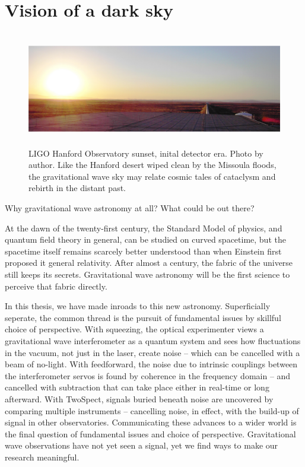     \section{Vision of a dark sky}
    \label{dark_sky}

\begin{figure}
\begin{center}
\includegraphics[height=50mm,width=148mm]{LIGOpanoramasmall.eps}
\caption{LIGO Hanford Observatory sunset, inital detector era. Photo by author. Like the Hanford desert wiped clean by the Missoula floods, the gravitational wave sky may relate cosmic tales of cataclysm and rebirth in the distant past.}
\label{LIGO_panorama_small}
\end{center}
\end{figure}

        Why gravitational wave astronomy at all? What could be out there?

        At the dawn of the twenty-first century, the Standard Model of physics, and quantum field theory in general, can be studied on curved spacetime, but the spacetime itself remains scarcely better understood than when Einstein first proposed it general relativity. 
After almost a century, the fabric of the universe still keeps its secrets. 
Gravitational wave astronomy will be the first science to perceive that fabric directly. 

        In this thesis, we have made inroads to this new astronomy. Superficially seperate, the common thread is the pursuit of fundamental issues by skillful choice of perspective. 
With squeezing, the optical experimenter views a gravitational wave interferometer as a quantum system and sees how fluctuations in the vacuum, not just in the laser, create noise -- which can be cancelled with a beam of no-light.
With feedforward, the noise due to intrinsic couplings between the interferometer servos is found by coherence in the frequency domain -- and cancelled with subtraction that can take place either in real-time or long afterward.
With TwoSpect, signals buried beneath noise are uncovered by comparing multiple instruments -- cancelling noise, in effect, with the build-up of signal in other observatories.
Communicating these advances to a wider world is the final question of fundamental issues and choice of perspective.
Gravitational wave observations have not yet seen a signal, yet we find ways to make our research meaningful.

